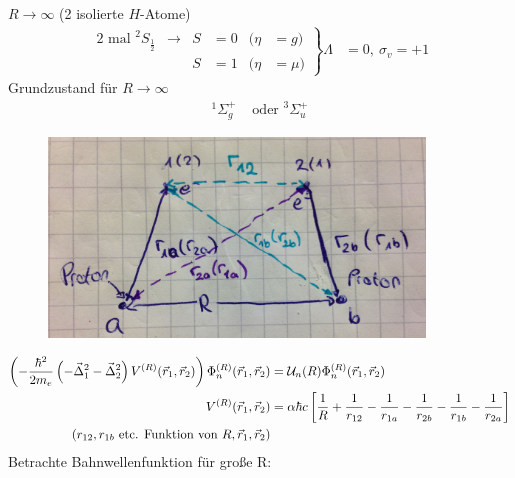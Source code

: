 $R \rightarrow \infty$ (2 isolierte $H$-Atome)
	\begin{align*}
		\left.
		\begin{aligned}
			2 \text{ mal } ^2S_{\frac{1}{2}} &\longrightarrow &
			S &= 0 & (\eta &= g) \\
			& & S &= 1 & (\eta &= \mu) 
		\end{aligned}
		\right\}
		\Lambda &= 0 ,~ \sigma_v  = +1
	\end{align*}
Grundzustand für $R \rightarrow \infty$ 
	\begin{align*}
		^1\Sigma^+_g &\text{ oder } ^3\Sigma^+_u
	\end{align*}
	\begin{figure} [h]
		\begin{center}
			\includegraphics[width=10cm]{Homonukleare_Molekuele3}
		\end{center}
	\end{figure}
	\begin{align*}
		\left(
		-\frac{\hbar^2}{2m_e} 
		\left(
		- \vec{\Delta}^2_1 - \vec{\Delta}^2_2
		\right) 
		V^{(R)}(\vec{r}_1, \vec{r}_2)
		\right)
		\Phi_n^{(R)} (\vec{r}_1, \vec{r}_2) 
		&= \mathcal{U}_n (R) \Phi_n^{(R)} (\vec{r}_1, \vec{r}_2) \\
		V^{(R)} (\vec{r}_1, \vec{r}_2) 
		&= \alpha \hbar c
		\left[
		\frac{1}{R} + \frac{1}{r_{12}} - \frac{1}{r_{1a}} - \frac{1}{r_{2b}} - \frac{1}{r_{1b}}
		- \frac{1}{r_{2a}}
		\right] \\
		(r_{12}, r_{1b} \text{ etc. Funktion von } R,\vec{r}_1, \vec{r}_2)
	\end{align*}
Betrachte Bahnwellenfunktion für große R:


